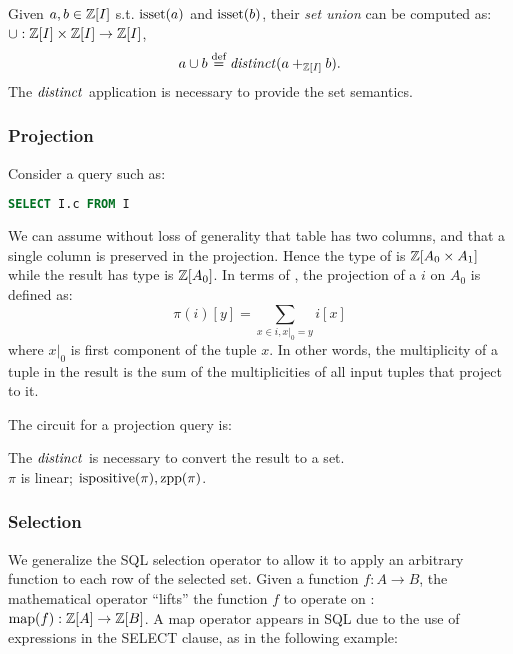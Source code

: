 Given \zrs $a, b \in \mathbb{Z}[I]$ s.t. $\mbox{isset}(a)$ and $\mbox{isset}(b)$, their \emph{set union} 
can be computed as: $\cup: \mathbb{Z}[I] \times \mathbb{Z}[I] \rightarrow \mathbb{Z}[I]$,  $$a
\cup b \stackrel{\textrm{\scriptsize def}}{=} \mathit{distinct}(a +_{\mathbb{Z}[I]} b).$$  
The $\mathit{distinct}$ application is necessary to provide the set semantics.

\subsubsection{Projection}
Consider a query such as:

\begin{lstlisting}[language=SQL]
SELECT I.c FROM I
\end{lstlisting}

We can assume without loss of generality that table  has two columns, and that 
a single column is preserved in the projection.
Hence the type of  is $\mathbb{Z}[A_0 \times A_1]$ while the result has type is $\mathbb{Z}[A_0]$.
In terms of \zrs, the projection of a \zr $i$ on $A_0$ is defined as: $$\pi(i)[y] = 
\sum_{x \in i, x|_0 = y} i[x]$$
\noindent where $x|_0$ is first component of the tuple $x$.
In other words, the multiplicity of a tuple in the result is the sum 
of the multiplicities of all input tuples that project to it.

The circuit for a projection query is:

\begin{center}
\end{center}

The $\mathit{distinct}$ is necessary to convert the result to a set.\\
$\pi$ is linear; $\mbox{ispositive}(\pi), \mbox{zpp}(\pi)$.

\subsubsection{Selection}

We generalize the SQL selection operator to allow it to apply an arbitrary function to each row of the
selected set.
Given a function $f : A \rightarrow B$, the mathematical  operator ``lifts'' the
function $f$ to operate on \zrs: $\mbox{map}(f) : \mathbb{Z}[A] \rightarrow \mathbb{Z}[B]$.  A map operator
appears in SQL due to the use of expressions in the SELECT clause, as in the following example:

